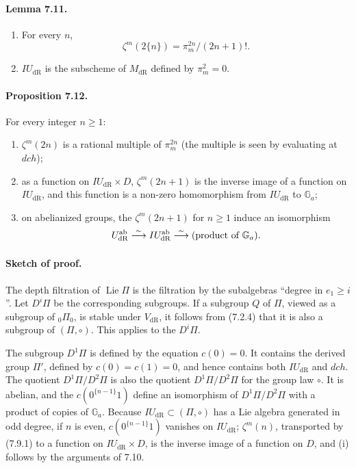 \documentclass[10pt]{article}
\newcommand{\Ga}{\mathbb G_a}
\newcommand{\Lie}{\operatorname{Lie}}
\newcommand{\dR}{\mathrm{dR}}
\begin{document}
\paragraph{Lemma 7.11.}
\begin{enumerate}[label=(\roman*)]
\item For every $n$,
\[
\zeta^m(2\{n\})=\pi_m^{2n}/(2n+1)!.
\]
\item $IU_{\dR}$ is the subscheme of $M_{\dR}$ defined by $\pi_m^2=0$.
\end{enumerate}

\paragraph{Proposition 7.12.}
For every integer $n\geq1$:
\begin{enumerate}[label=(\roman*)]
\item $\zeta^m(2n)$ is a rational multiple of $\pi_m^{2n}$ (the multiple is seen by evaluating at $dch$);
\item as a function on $IU_{\dR}\times D$, $\zeta^m(2n+1)$ is the inverse image of a function on $IU_{\dR}$, and this function is a non-zero homomorphism from $IU_{\dR}$ to $\Ga$;
\item on abelianized groups, the $\zeta^m(2n+1)$ for $n\geq1$ induce an isomorphism
\[
U_{\dR}^{\mathrm{ab}}\overset{\sim}{\longrightarrow}IU_{\dR}^{\mathrm{ab}}\overset{\sim}{\longrightarrow}\hbox{(product of }\Ga\hbox{)}.
\]
\end{enumerate}

\paragraph{Sketch of proof.}
The depth filtration of $\Lie\Pi$ is the filtration by the subalgebras ``degree in $e_1\geq i$''. Let $D^i\Pi$ be the corresponding subgroups. If a subgroup $Q$ of $\Pi$, viewed as a subgroup of ${}_0\Pi_0$, is stable under $V_{\dR}$, it follows from (7.2.4) that it is also a subgroup of $(\Pi,\circ)$. This applies to the $D^i\Pi$.

The subgroup $D^1\Pi$ is defined by the equation $c(0)=0$. It contains the derived group $\Pi'$, defined by $c(0)=c(1)=0$, and hence contains both $IU_{\dR}$ and $dch$. The quotient $D^1\Pi/D^2\Pi$ is also the quotient $D^1\Pi/D^2\Pi$ for the group law $\circ$. It is abelian, and the $c(0^{\{n-1\}}1)$ define an isomorphism of $D^1\Pi/D^2\Pi$ with a product of copies of $\Ga$. Because $IU_{\dR}\subset(\Pi,\circ)$ has a Lie algebra generated in odd degree, if $n$ is even, $c(0^{\{n-1\}}1)$ vanishes on $IU_{\dR}$; $\zeta^m(n)$, transported by (7.9.1) to a function on $IU_{\dR}\times D$, is the inverse image of a function on $D$, and (i) follows by the arguments of 7.10.
\end{document}
